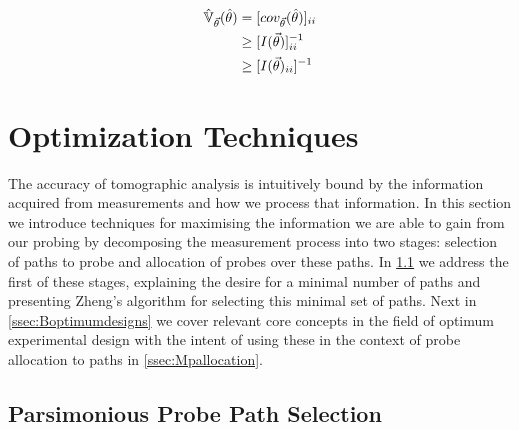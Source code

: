 \begin{align*}
    \operatorname{\hat{\mathbb{V}}}_{\vec{\theta}}(\hat\theta) &= [cov_{\vec{\theta}}(\hat\theta)]_{ii}\\
    &\geq [I(\vec{\theta})]^{-1}_{ii}\\
    &\geq [I(\vec{\theta})_{ii}]^{-1}
\end{align*}

\section{Optimization Techniques}
\label{sec:Boptimization}
The accuracy of tomographic analysis is intuitively bound by the information acquired from measurements and how we process that information. In this section we introduce techniques for maximising the information we are able to gain from our probing by decomposing the measurement process into two stages: selection of paths to probe and allocation of probes over these paths. In \cref{ssec:Bparsppselection} we address the first of these stages, explaining the desire for a minimal number of paths and presenting Zheng's algorithm for selecting this minimal set of paths. Next in \cref{ssec:Boptimumdesigns} we cover relevant core concepts in the field of optimum experimental design with the intent of using these in the context of probe allocation to paths in \cref{ssec:Mpallocation}.

\subsection{Parsimonious Probe Path Selection}
\label{ssec:Bparsppselection}

